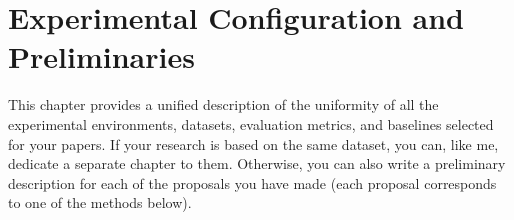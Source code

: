 
\chapter{Experimental Configuration and Preliminaries}
\label{Chapter3} 

This chapter provides a unified description of the uniformity of all the experimental environments, datasets, evaluation metrics, and baselines selected for your papers. If your research is based on the same dataset, you can, like me, dedicate a separate chapter to them. Otherwise, you can also write a preliminary description for each of the proposals you have made (each proposal corresponds to one of the methods below).
